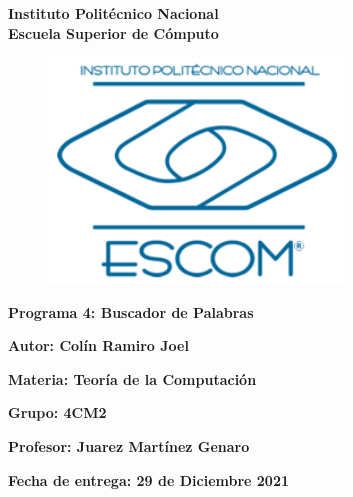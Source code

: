\documentclass{article}
\begin{document}
	\begin{titlepage}
		\begin{center}
			{\huge\textbf{Instituto Politécnico Nacional}}\\
			\vspace{7mm}
			{\huge\textbf{Escuela Superior de Cómputo}}\\			
			\begin{figure}[h]
				\centering
				\includegraphics[height = 6cm]{logoEscom.png}
			\end{figure}	
			\vspace{1cm}
			{\huge\textbf{Programa 4: Buscador de Palabras}}
			\par\vspace{2cm}
			\large\textbf{Autor: Colín Ramiro Joel}
			\par\vspace{1cm}
			{\large\textbf{Materia: Teoría de la Computación}}
			\par\vspace{1cm}
			{\large\textbf{Grupo: 4CM2}}
			\par\vspace{1cm}
			{\large\textbf{Profesor: Juarez Martínez Genaro}}
			\par\vspace{1cm}
			{\large\textbf{Fecha de entrega: {\huge{29 de Diciembre 2021}}}}
			\par\vspace{3cm}
		\end{center}
	\end{titlepage}	
	
\end{document}
